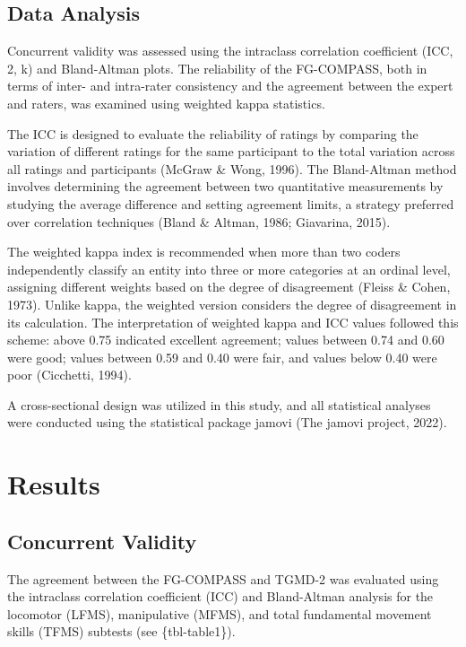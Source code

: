 \documentclass[
  man,
  colorlinks=true,linkcolor=blue,citecolor=blue,urlcolor=blue]{apa7}
\begin{document}
\subsection{Data Analysis}\label{data-analysis}

Concurrent validity was assessed using the intraclass correlation
coefficient (ICC, 2, k) and Bland-Altman plots. The reliability of the
FG-COMPASS, both in terms of inter- and intra-rater consistency and the
agreement between the expert and raters, was examined using weighted
kappa statistics.

The ICC is designed to evaluate the reliability of ratings by comparing
the variation of different ratings for the same participant to the total
variation across all ratings and participants (McGraw \& Wong, 1996).
The Bland-Altman method involves determining the agreement between two
quantitative measurements by studying the average difference and setting
agreement limits, a strategy preferred over correlation techniques
(Bland \& Altman, 1986; Giavarina, 2015).

The weighted kappa index is recommended when more than two coders
independently classify an entity into three or more categories at an
ordinal level, assigning different weights based on the degree of
disagreement (Fleiss \& Cohen, 1973). Unlike kappa, the weighted version
considers the degree of disagreement in its calculation. The
interpretation of weighted kappa and ICC values followed this scheme:
above 0.75 indicated excellent agreement; values between 0.74 and 0.60
were good; values between 0.59 and 0.40 were fair, and values below 0.40
were poor (Cicchetti, 1994).

A cross-sectional design was utilized in this study, and all statistical
analyses were conducted using the statistical package jamovi (The jamovi
project, 2022).

\section{Results}\label{results}

\subsection{Concurrent Validity}\label{concurrent-validity}

The agreement between the FG-COMPASS and TGMD-2 was evaluated using the
intraclass correlation coefficient (ICC) and Bland-Altman analysis for
the locomotor (LFMS), manipulative (MFMS), and total fundamental
movement skills (TFMS) subtests (see \{tbl-table1\}).
\end{document}
